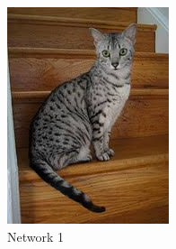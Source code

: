 \begin{figure}
	\centering
	\begin{subfigure}[b]{0.475\textwidth}
		\centering
		\includegraphics[width=\textwidth]{archivos/cat.jpg}
		\caption[Network2]%
		{{\small Network 1}}    
		\label{fig:mean and std of net14}
	\end{subfigure}
	\hfill
	\begin{subfigure}[b]{0.475\textwidth}  
		\centering 

\end{subfigure}
\end{figure}
